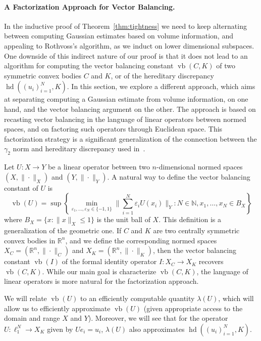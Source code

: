 \documentclass[11pt]{article}
\newcommand{\R}{{\mathbb{R}}}
\newcommand\eps{\varepsilon}
\DeclareMathOperator{\hd}{hd}
\DeclareMathOperator{\vb}{vb}
\begin{document}
\paragraph{\bf A Factorization Approach for Vector Balancing.}   

In the inductive proof of Theorem~\ref{thm:tightness} we need to keep
alternating between computing Gaussian estimates based on volume
information, and appealing to Rothvoss's algorithm, as we induct
on lower dimensional subspaces. One downside of this indirect nature
of our proof is that it does not lead to an algorithm for computing
the vector balancing constant $\vb(C,K)$ of two symmetric convex
bodies $C$ and $K$, or of the hereditary discrepancy $\hd((u_i)_{i =
  1}^N, K)$. In this section, we explore a different approach, which
aims at separating computing a Gaussian estimate from volume
information, on one hand, and the vector balancing argument on the
other. The approach is based on recasting vector balancing in the
language of linear operators between normed spaces, and on factoring
such operators through Euclidean space. This factorization strategy is
a significant generalization of the connection between the $\gamma_2$
norm and hereditary discrepancy used in~\cite{disc-gamma2}.


Let $U:X \to Y$ be a linear operator between two $n$-dimensional
normed spaces $(X, \| \cdot\|_X)$ and $(Y, \| \cdot\|_Y)$. A natural
way to define the vector balancing constant of $U$ is
\begin{equation}\label{eq:vb-oper}
\vb(U) = \sup\left\{
  \min_{\eps_1, \ldots, \eps_N \in \{-1, 1\}} 
  \biggl\|\sum_{i = 1}^N \eps_i U(x_i)\biggr\|_Y:
  N \in \mathbb{N}, x_1, \ldots, x_N \in B_X\right\}
\end{equation}
where $B_X = \{x: \|x\|_X \le 1\}$ is the unit ball of $X$. This
definition is a generalization of the geometric one. If $C$ and
$K$ are two centrally symmetric convex bodies in $\R^n$, and we define
the corresponding normed spaces $X_C = (\R^n, \|\cdot\|_C)$ and $X_K =
(\R^n, \|\cdot\|_K)$, then the vector balancing constant $\vb(I)$ of
the formal identity operator $I:X_C \to X_K$ recovers $\vb(C,
K)$. While our main goal is characterize $\vb(C, K)$, the language of
linear operators is more natural for the factorization approach. 

We will relate $\vb(U)$ to an efficiently computable quantity
$\lambda(U)$, which will allow us to efficiently approximate $\vb(U)$
(given appropriate access to the domain and range $X$ and
$Y$). Moreover, we will see that for the operator $U:\ell_1^N \to X_K$
given by $Ue_i = u_i$, $\lambda(U)$ also approximates $\hd((u_i)_{i =
  1}^N, K)$. 
\end{document}
